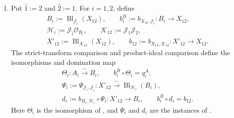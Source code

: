 \begin{definition}
\begin{enumerate}
\[      \]
      where the last predicate is base-change stability for
      \(U_i^A=A_i\times_{X_i^i}U\).
    \item Put \(\widehat 1:=2\) and \(\widehat 2:=1\).  For \(i=1,2\),
      define
      \[
      \begin{gathered}
        B_i:=\operatorname{Bl}_{\mathcal J_i}(X_{12}),\qquad
        b_i^B:=b_{X_{12},\mathcal J_i}\colon B_i\to X_{12},\\
        \mathcal H_i:=\mathcal J_{\widehat i}\mathcal O_{B_i},
        \qquad
        \mathcal K_{12}:=\mathcal J_1\mathcal J_2,\\
        X'_{12}:=\operatorname{Bl}_{\mathcal K_{12}}(X_{12}),
        \qquad
        b_{12}:=b_{X_{12},\mathcal K_{12}}
          \colon X'_{12}\to X_{12}.
      \end{gathered}
      \]
      The strict-transform comparison and product-ideal comparison define
      the isomorphisms and domination map
      \[
      \begin{gathered}
        \Theta_i\colon A_i\xrightarrow{\sim}B_i,\qquad
        b_i^B\circ\Theta_i=q_i^A,\\
        \Psi_i:=\Psi_{\mathcal J_i,\mathcal J_{\widehat i}}
          \colon X'_{12}\xrightarrow{\sim}
            \operatorname{Bl}_{\mathcal H_i}(B_i),\\
        d_i:=b_{B_i,\mathcal H_i}\circ\Psi_i
          \colon X'_{12}\longrightarrow B_i,\qquad
        b_i^B\circ d_i=b_{12}.
      \end{gathered}                                               \tag{CM0g}
      \]
      Here \(\Theta_i\) is the isomorphism of
      , and
      \(\Psi_i\) and \(d_i\) are the instances of
      .


\end{enumerate}
\end{definition}
